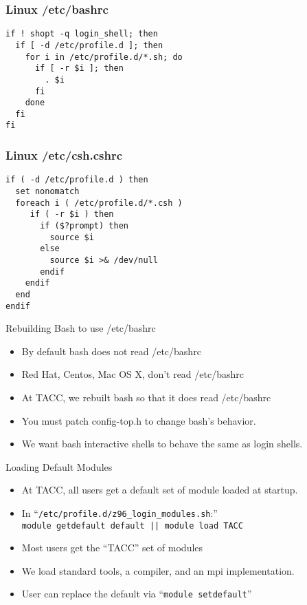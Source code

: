 \documentclass{beamer}
\begin{document}
\begin{frame}[fragile]
    \frametitle{Linux /etc/bashrc}
    {
\begin{verbatim}
if ! shopt -q login_shell; then
  if [ -d /etc/profile.d ]; then
    for i in /etc/profile.d/*.sh; do
      if [ -r $i ]; then
        . $i
      fi
    done
  fi
fi
\end{verbatim}
    }
\end{frame}

\begin{frame}[fragile]
    \frametitle{Linux /etc/csh.cshrc}
    {
\begin{verbatim}
if ( -d /etc/profile.d ) then
  set nonomatch
  foreach i ( /etc/profile.d/*.csh )
     if ( -r $i ) then
       if ($?prompt) then
         source $i
       else
         source $i >& /dev/null
       endif
    endif
  end
endif
\end{verbatim}
    }
\end{frame}

\begin{frame}{Rebuilding Bash to use /etc/bashrc}
  \begin{itemize}
    \item By default bash does not read /etc/bashrc
    \item Red Hat, Centos,  Mac OS X, don't read /etc/bashrc
    \item At TACC, we rebuilt bash so that it does read /etc/bashrc
    \item You must patch config-top.h to change bash's behavior.
    \item We want bash interactive shells to behave the same as login shells.
  \end{itemize}
\end{frame}

\begin{frame}{Loading Default Modules}
  \begin{itemize}
    \item At TACC, all users get a default set of module loaded at startup.
    \item In ``\texttt{/etc/profile.d/z96\_login\_modules.sh}:'' \\
      {\color{blue}\texttt{module getdefault default || module load TACC}}
    \item Most users get the ``TACC'' set of modules
    \item We load standard tools, a compiler, and an mpi implementation.
    \item User can replace the default via ``{\color{blue}\texttt{module setdefault}}''
  \end{itemize}
\end{frame}
\end{document}
